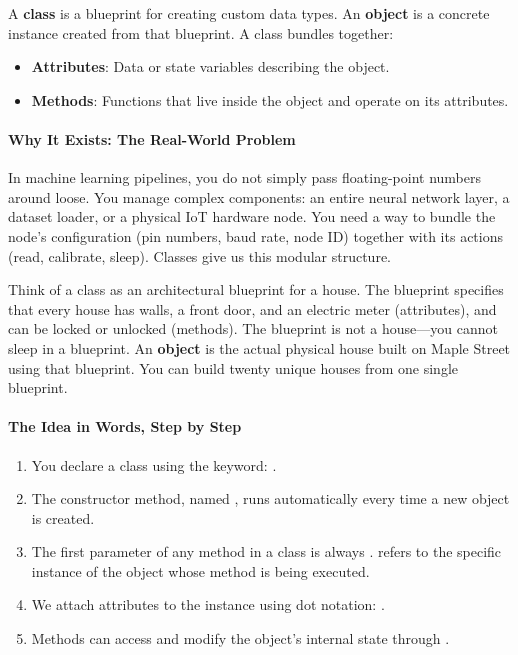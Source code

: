 \begin{keyidea}
A \textbf{class} is a blueprint for creating custom data types. An \textbf{object} is a concrete instance created from that blueprint. A class bundles together:
\begin{itemize}
    \item \textbf{Attributes}: Data or state variables describing the object.
    \item \textbf{Methods}: Functions that live inside the object and operate on its attributes.
\end{itemize}
\end{keyidea}

\paragraph{Why It Exists: The Real-World Problem}
In machine learning pipelines, you do not simply pass floating-point numbers around loose. You manage complex components: an entire neural network layer, a dataset loader, or a physical IoT hardware node. You need a way to bundle the node's configuration (pin numbers, baud rate, node ID) together with its actions (read, calibrate, sleep). Classes give us this modular structure.

\begin{analogy}
Think of a class as an architectural blueprint for a house. The blueprint specifies that every house has walls, a front door, and an electric meter (attributes), and can be locked or unlocked (methods). The blueprint is not a house—you cannot sleep in a blueprint. An \textbf{object} is the actual physical house built on Maple Street using that blueprint. You can build twenty unique houses from one single blueprint.
\end{analogy}

\paragraph{The Idea in Words, Step by Step}
\begin{enumerate}
    \item You declare a class using the  keyword: .
    \item The constructor method, named , runs automatically every time a new object is created.
    \item The first parameter of any method in a class is always .  refers to the specific instance of the object whose method is being executed.
    \item We attach attributes to the instance using dot notation: .
    \item Methods can access and modify the object's internal state through .
\end{enumerate}

